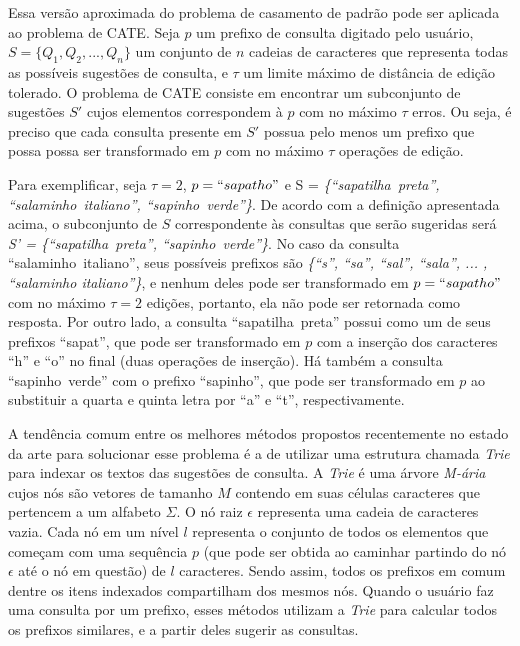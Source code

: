 Essa versão aproximada do problema de casamento de padrão pode ser aplicada ao problema de CATE. Seja $p$ um prefixo de consulta digitado pelo usuário, $S=\{Q_{1}, Q_{2}, ... , Q_{n}\}$ um conjunto de $n$ cadeias de caracteres que representa todas as possíveis sugestões de consulta, e $\tau$ um limite máximo de distância de edição tolerado. O problema de CATE consiste em encontrar um subconjunto de sugestões $S'$ cujos elementos correspondem à $p$ com no máximo $\tau$ erros. Ou seja, é preciso que cada consulta presente em $S'$ possua pelo menos um prefixo que possa possa ser transformado em $p$ com no máximo $\tau$ operações de edição.

Para exemplificar, seja $\tau = 2$, $p = ``sapatho"$ e S = \textit{\{``sapatilha\ preta'', ``salaminho\ italiano'', ``sapinho\ verde''\}}. De acordo com a definição apresentada acima, o subconjunto de $S$ correspondente às consultas que serão sugeridas será \textit{S' = \{``sapatilha\ preta'', ``sapinho\ verde''\}}. No caso da consulta ``salaminho\ italiano'', seus possíveis prefixos são \textit{\{``s'', ``sa'', ``sal'', ``sala'', ... , ``salaminho italiano''\}}, e nenhum deles pode ser transformado em $p = ``sapatho"$ com no máximo $\tau = 2$ edições, portanto, ela não pode ser retornada como resposta. Por outro lado, a consulta ``sapatilha\ preta'' possui como um de seus prefixos ``sapat'', que pode ser transformado em $p$ com a inserção dos caracteres ``h'' e ``o'' no final (duas operações de inserção). Há também a consulta ``sapinho\ verde'' com o prefixo ``sapinho'', que pode ser transformado em $p$ ao substituir a quarta e quinta letra por ``a'' e ``t'', respectivamente.

A tendência comum entre os melhores métodos propostos recentemente no estado da arte para solucionar esse problema \citep{chaudhuri2009extending,ji2009efficient,li2011efficient, xiao2013efficient,deng2016meta, zhou2016beva} é a de utilizar uma estrutura chamada  \textit{Trie} \citep{fredkintrie1960} para indexar os textos das sugestões de consulta. A \textit{Trie} é uma árvore \textit{M-ária} cujos nós são vetores de tamanho $M$ contendo em suas células caracteres que pertencem a um alfabeto $\Sigma$. O nó raiz $\epsilon$ representa uma cadeia de caracteres vazia. Cada nó em um nível $l$ representa o conjunto de todos os elementos que começam com uma sequência $p$ (que pode ser obtida ao caminhar partindo do nó $\epsilon$ até o nó em questão) de $l$ caracteres. Sendo assim, todos os prefixos em comum dentre os itens indexados compartilham dos mesmos nós. Quando o usuário faz uma consulta por um prefixo, esses métodos utilizam a \textit{Trie} para calcular todos os prefixos similares, e a partir deles sugerir as consultas.

